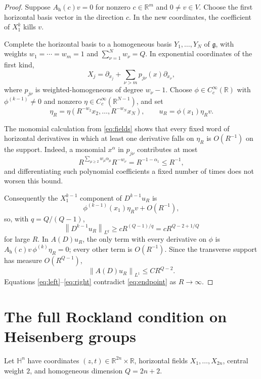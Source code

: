 \documentclass[11pt]{article}
\newcommand{\R}{\mathbb R}
\newcommand{\norm}[1]{\left\lVert#1\right\rVert}
\begin{document}
\begin{proof}
Suppose $A_{\mathrm h}(c)v=0$ for nonzero $c\in\R^m$ and $0\ne v\in V$.
Choose the first horizontal basis vector in the direction $c$.  In the new
coordinates, the coefficient of $X_1^k$ kills $v$.

Complete the horizontal basis to a homogeneous basis $Y_1,\ldots,Y_N$ of
$\mathfrak g$, with weights $w_1=\cdots=w_m=1$ and
$\sum_{\nu=1}^Nw_\nu=Q$.  In exponential coordinates of the first kind,
\begin{equation}\label{eq:fields}
 X_j=\partial_{x_j}+\sum_{\nu>m}p_{j\nu}(x)\partial_{x_\nu},
\end{equation}
where $p_{j\nu}$ is weighted-homogeneous of degree $w_\nu-1$.
Choose $\phi\in C_c^\infty(\R)$ with $\phi^{(k-1)}\ne0$ and nonzero
$\eta\in C_c^\infty(\R^{N-1})$, and set
\[
 \eta_R=\eta(R^{-w_2}x_2,\ldots,R^{-w_N}x_N),
 \qquad u_R=\phi(x_1)\eta_Rv.
\]

The monomial calculation from \eqref{eq:fields} shows that every fixed word
of horizontal derivatives in which at least one derivative falls on
$\eta_R$ is $O(R^{-1})$ on the support.  Indeed, a monomial $x^\alpha$ in
$p_{j\nu}$ contributes at most
\[
 R^{\sum_{\mu\ge2}w_\mu\alpha_\mu}R^{-w_\nu}
 =R^{-1-\alpha_1}\le R^{-1},
\]
and differentiating such polynomial coefficients a fixed number of times
does not worsen this bound.

Consequently the $X_1^{k-1}$ component of $D^{k-1}u_R$ is
\[
 \phi^{(k-1)}(x_1)\eta_Rv+O(R^{-1}),
\]
so, with $q=Q/(Q-1)$,
\begin{equation}\label{eq:left}
 \norm{D^{k-1}u_R}_{L^q}\ge cR^{(Q-1)/q}
 =cR^{Q-2+1/Q}
\end{equation}
for large $R$.  In $A(D)u_R$, the only term with every derivative on $\phi$
is $A_{\mathrm h}(c)v\,\phi^{(k)}\eta_R=0$; every other term is
$O(R^{-1})$.  Since the transverse support has measure $O(R^{Q-1})$,
\begin{equation}\label{eq:right}
 \norm{A(D)u_R}_{L^1}\le CR^{Q-2}.
\end{equation}
Equations \eqref{eq:left}--\eqref{eq:right} contradict
\eqref{eq:endpoint} as $R\to\infty$.
\end{proof}

\section{The full Rockland condition on Heisenberg groups}

Let $\mathbb H^n$ have coordinates $(z,t)\in\R^{2n}\times\R$, horizontal
fields $X_1,\ldots,X_{2n}$, central weight $2$, and homogeneous dimension
$Q=2n+2$.
\end{document}
